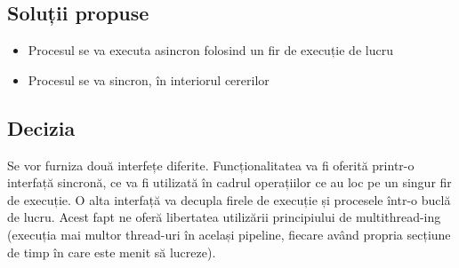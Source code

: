 	\subsection{Soluții propuse}
	\begin{itemize}
	 \setlength\itemsep{0em}
		\item Procesul se va executa asincron folosind un fir de execuție de lucru
		\item	Procesul se va sincron, în interiorul cererilor
	\end{itemize}


	\subsection{Decizia}
	Se vor furniza două interfețe diferite. Funcționalitatea va fi oferită printr-o interfață sincronă, ce va fi utilizată în cadrul operațiilor ce au loc pe un singur fir de execuție. O alta interfață va decupla firele de execuție și procesele într-o buclă de lucru.
	Acest fapt ne oferă libertatea utilizării principiului de multithread-ing (execuția mai multor thread-uri în același pipeline, fiecare având propria secțiune de timp în care este menit să lucreze).


